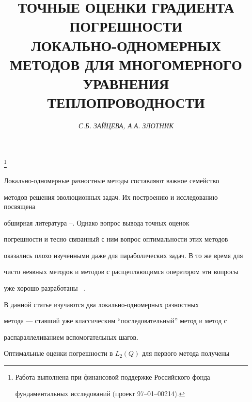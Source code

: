 \author{\it С.Б. ЗАЙЦЕВА, А.А. ЗЛОТНИК}


\title{ТОЧНЫЕ ОЦЕНКИ ГРАДИЕНТА ПОГРЕШНОСТИ\\


ЛОКАЛЬНО-ОДНОМЕРНЫХ МЕТОДОВ ДЛЯ МНОГОМЕРНОГО\\


УРАВНЕНИЯ ТЕПЛОПРОВОДНОСТИ}





\thanks{Работа выполнена при финансовой поддержке Российского фонда


фундаментальных исследований (проект 97--01--00214).}


\date{}


\pagestyle{plain}








\maketitle







 


Локально-одномерные разностные методы составляют важное семейство


методов решения эволюционных задач. Их построению и исследованию посвящена


обширная литература \cite{Yan}--\cite{Kov}. Однако вопрос вывода точных оценок


погрешности и тесно связанный с ним вопрос оптимальности этих методов 


оказались плохо изученными даже для параболических задач. В то же время для


чисто неявных методов и методов с расщепляющимся оператором эти вопросы


уже хорошо разработаны \cite{Ba}--\cite{Z7}.





В данной статье изучаются два локально-одномерных разностных


метода --- ставший уже классическим ``последовательный'' метод и метод с 


распараллеливанием вспомогательных шагов.


Оптимальные оценки погрешности в $L_2(Q)$ для  первого метода получены 



